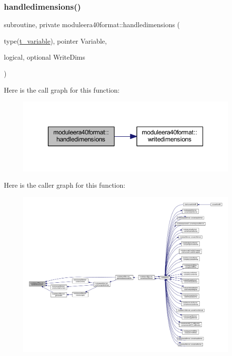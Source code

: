 \subsubsection{\texorpdfstring{handledimensions()}{handledimensions()}}
{\footnotesize\ttfamily subroutine, private moduleera40format\+::handledimensions (\begin{DoxyParamCaption}\item[{type(\mbox{\hyperlink{structmoduleera40format_1_1t__variable}{t\+\_\+variable}}), pointer}]{Variable,  }\item[{logical, optional}]{Write\+Dims }\end{DoxyParamCaption})\hspace{0.3cm}{\ttfamily [private]}}

Here is the call graph for this function\+:\nopagebreak
\begin{figure}[H]
\begin{center}
\leavevmode
\includegraphics[width=326pt]{namespacemoduleera40format_a2dffd2c3e28995426ed11ff1f4ca7ad9_cgraph}
\end{center}
\end{figure}
Here is the caller graph for this function\+:\nopagebreak
\begin{figure}[H]
\begin{center}
\leavevmode
\includegraphics[width=350pt]{namespacemoduleera40format_a2dffd2c3e28995426ed11ff1f4ca7ad9_icgraph}
\end{center}
\end{figure}
\mbox{\label{namespacemoduleera40format_a54957082dfc56590cf35c0fb8138161f}} 
